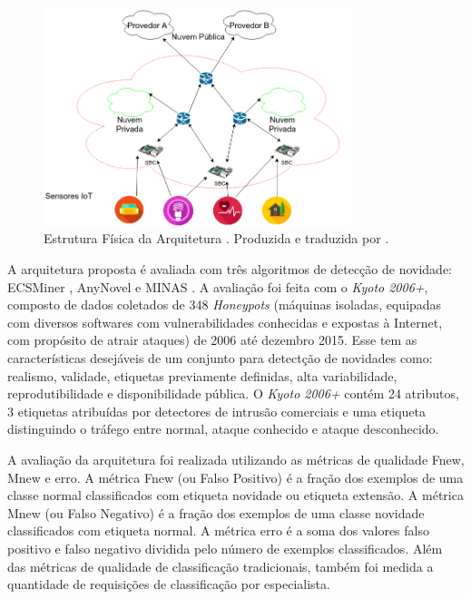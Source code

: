 \begin{figure}[ht]
\centering
\includegraphics[width=0.8\textwidth]{figuras/idsa-iot-quali-000.png}
\caption{Estrutura Física da Arquitetura \idsiot.
Produzida e traduzida por .}
\label{fig:ids-iot-phy}
\end{figure}

A arquitetura proposta é avaliada com três algoritmos de detecção de novidade:
ECSMiner \cite{Masud2010ECSMiner}, AnyNovel \cite{Abdallah2016anynovel} e MINAS
\cite{Faria2015minas}.
A avaliação foi feita com o \dataset \emph{Kyoto 2006+}, composto de
dados coletados de 348 \emph{Honeypots} 
(máquinas isoladas, equipadas com diversos
softwares com vulnerabilidades conhecidas e expostas à Internet, com propósito de
atrair ataques) de 2006 até dezembro 2015.
Esse \dataset tem as características desejáveis de um conjunto para detectção de
novidades como: realismo, validade, etiquetas previamente definidas, alta
variabilidade, reprodutibilidade e disponibilidade pública.
O \dataset \emph{Kyoto 2006+} contém 24 atributos, 3 etiquetas atribuídas por
detectores de intrusão comerciais e uma etiqueta
distinguindo o tráfego entre normal, ataque conhecido e ataque desconhecido.

A avaliação da arquitetura foi realizada utilizando as métricas de qualidade
Fnew, Mnew e erro.
A métrica Fnew (ou Falso Positivo) é a fração dos exemplos de uma classe normal
classificados com etiqueta novidade ou etiqueta extensão.
A métrica Mnew (ou Falso Negativo) é a fração dos exemplos de uma classe novidade
classificados com etiqueta normal.
A métrica erro é a soma dos valores falso positivo e falso negativo dividida
pelo número de exemplos classificados.
Além das métricas de qualidade de classificação tradicionais, também foi medida
a quantidade de requisições de classificação por especialista.

